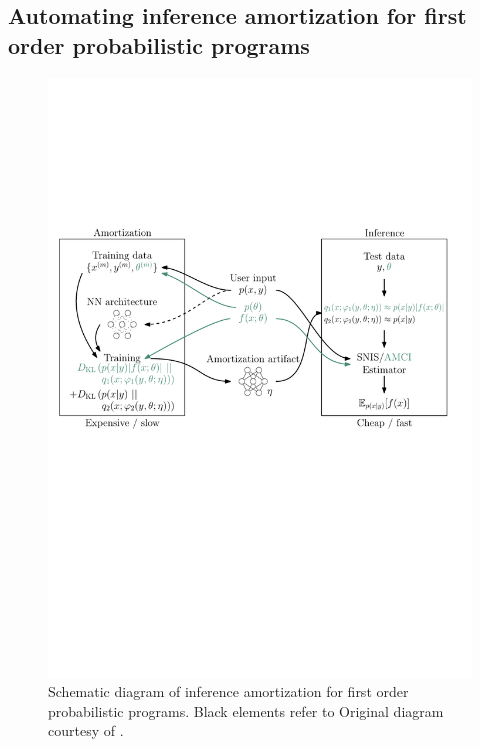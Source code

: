 \documentclass[12pt]{article}
\begin{document}
\subsection{Automating inference amortization for first order probabilistic programs}

\begin{figure}[t]
  \centering
  \includegraphics[width=\linewidth]{figures/diagram.pdf}
  \caption{
  Schematic diagram of inference amortization for first order probabilistic programs. 
  Black elements refer to 
  Original diagram courtesy of \citet{LeEtAl2016}.}
  \label{fig:inf-amortization}
\end{figure}

\end{document}
